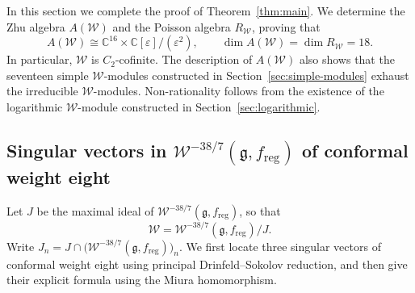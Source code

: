 \documentclass[11pt]{amsart}
\numberwithin{equation}{section}
\theoremstyle{definition}
\theoremstyle{remark}
\newcommand{\g}{\mathfrak g}
\begin{document}
In this section we complete the proof of Theorem~\ref{thm:main}.
We determine the Zhu algebra $A(\mathcal W)$ and the Poisson algebra
$R_{\mathcal W}$, proving that
\[
 A(\mathcal W)\cong
 \mathbb C^{16}\times\mathbb C[\varepsilon]/(\varepsilon^2),
 \qquad
 \dim A(\mathcal W)=\dim R_{\mathcal W}=18.
\]
In particular, $\mathcal W$ is $C_2$-cofinite.
The description of $A(\mathcal W)$ also shows that the seventeen
simple $\mathcal W$-modules constructed in Section~\ref{sec:simple-modules}
exhaust the irreducible $\mathcal W$-modules.
Non-rationality follows from the existence of the  logarithmic $\mathcal W$-module
constructed in Section~\ref{sec:logarithmic}.




 

 

\subsection{\texorpdfstring{Singular vectors in $\mathcal W^{-38/7}(\g,f_{\mathrm{reg}})$ of conformal weight eight}{Singular vectors in W(-38/7)(D4, f reg) of conformal weight eight}}
Let $J$ be the maximal ideal of $\mathcal W^{-38/7}(\g,f_{\mathrm{reg}})$, so that
\[
 \mathcal W=\mathcal W^{-38/7}(\g,f_{\mathrm{reg}})/J.
\]
Write $J_n=J\cap \bigl(\mathcal W^{-38/7}(\g,f_{\mathrm{reg}})\bigr)_n$. We first locate three singular vectors of conformal weight eight
using principal Drinfeld--Sokolov reduction, and then give their explicit formula using the Miura homomorphism.
\end{document}
